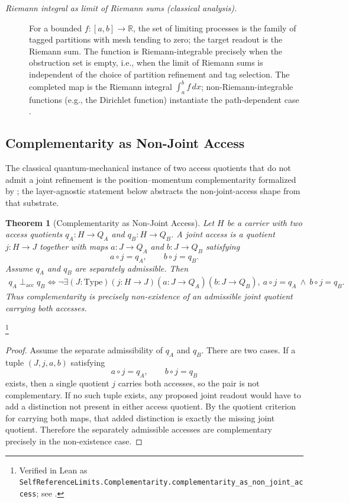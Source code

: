 \documentclass[11pt]{article}
\newtheorem{theorem}{Theorem}[section]
\theoremstyle{definition}
\begin{document}
\begin{description}
\item[\emph{Riemann integral as limit of Riemann sums
(classical analysis).}]
For a bounded \(f:[a,b]\to\mathbb R\), the set of
limiting processes is the family of tagged
partitions with mesh tending to zero; the target
readout is the Riemann sum.  The function is
Riemann-integrable precisely when the obstruction
set is empty, i.e., when the limit of Riemann sums
is independent of the choice of partition
refinement and tag selection.  The completed map is
the Riemann integral
\(\int_a^b f\,dx\); non-Riemann-integrable functions
(e.g., the Dirichlet function) instantiate the
path-dependent case
\citep{Riemann1854Habilitationsschrift}.
\end{description}

\subsection{Complementarity as Non-Joint Access}\label{sec:self-reference-limits:complementarity}

The classical quantum-mechanical instance of two access quotients
that do not admit a joint refinement is the
position--momentum complementarity formalized by
\citet{Bohr1928Quantum}; the layer-agnostic statement below
abstracts the non-joint-access shape from that substrate.

\begin{theorem}[Complementarity as Non-Joint Access]\label{thm:F37}
Let \(H\) be a carrier with two access quotients
\(q_A:H\to Q_A\) and \(q_B:H\to Q_B\). A joint access is a quotient
\(j:H\to J\) together with maps \(a:J\to Q_A\) and \(b:J\to Q_B\)
satisfying
\[
  a\circ j=q_A,\qquad b\circ j=q_B .
\]
Assume \(q_A\) and \(q_B\) are separately admissible. Then
\begin{align*}
  q_A \perp_{\mathrm{acc}} q_B
  \iff
  \neg\exists (J: \mathrm{Type})(j:H\to J)(a:J\to Q_A)(b:J\to Q_B),\
  a\circ j=q_A\ \wedge\ b\circ j=q_B .
\end{align*}
Thus complementarity is precisely non-existence of an admissible joint
quotient carrying both accesses.
\end{theorem}
\footnote{\raggedright Verified in Lean as
\texttt{SelfReferenceLimits.\allowbreak{}Complementarity.\allowbreak{}complementarity\_as\_non\_joint\_access};
see \Cref{app:formalization}.}
\begin{proof}
Assume the separate admissibility of \(q_A\) and \(q_B\). There are two
cases. If a tuple \((J,j,a,b)\) satisfying
\[
  a\circ j=q_A,\qquad b\circ j=q_B
\]
exists, then a single quotient \(j\) carries both accesses, so the pair
is not complementary. If no such tuple exists, any proposed joint
readout would have to add a distinction not present in either access
quotient. By the quotient criterion for carrying both maps, that added
distinction is exactly the missing joint quotient. Therefore the
separately admissible accesses are complementary precisely in the
non-existence case.
\end{proof}
\end{document}
